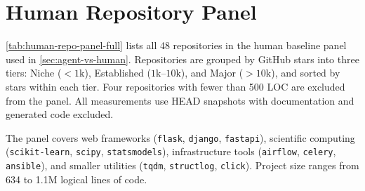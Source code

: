 \section{Human Repository Panel}\label{sec:human-repo-panel}

\autoref{tab:human-repo-panel-full} lists all 48 repositories in the human baseline panel used in \autoref{sec:agent-vs-human}. Repositories are grouped by GitHub stars into three tiers: Niche ($< 1\text{k}$), Established ($1\text{k}\text{--}10\text{k}$), and Major ($> 10\text{k}$), and sorted by stars within each tier. Four repositories with fewer than 500 LOC are excluded from the panel. All measurements use HEAD snapshots with documentation and generated code excluded.

The panel covers web frameworks (\texttt{flask}, \texttt{django}, \texttt{fastapi}), scientific computing (\texttt{scikit-learn}, \texttt{scipy}, \texttt{statsmodels}), infrastructure tools (\texttt{airflow}, \texttt{celery}, \texttt{ansible}), and smaller utilities (\texttt{tqdm}, \texttt{structlog}, \texttt{click}). Project size ranges from 634 to 1.1M logical lines of code.

